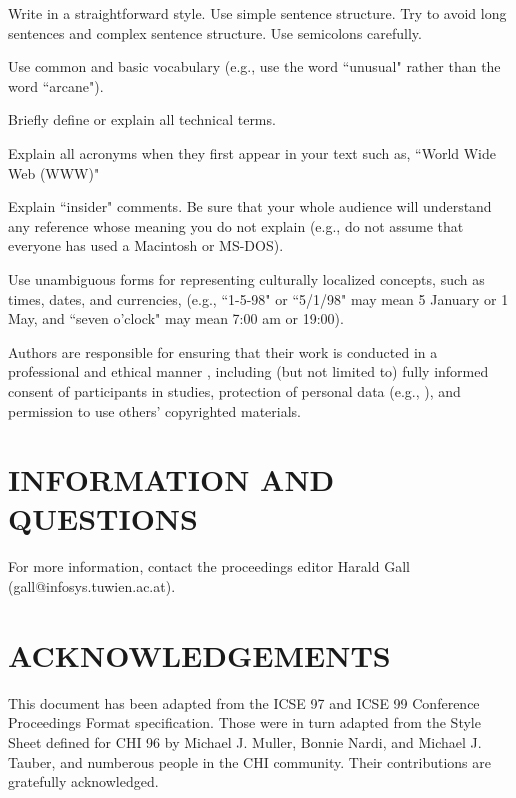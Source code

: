 \begin{smallitem}
\item Write in a straightforward style. Use simple sentence 
structure. Try to avoid long sentences and complex sentence 
structure. Use semicolons carefully.
 
\item Use common and basic vocabulary (e.g., use the word 
``unusual" rather than the word ``arcane").
 
\item Briefly define or explain all technical terms.
 
\item Explain all acronyms when they first appear in your text 
such as, ``World Wide Web (WWW)"
 
\item Explain ``insider" comments. Be sure that your whole 
audience will understand any reference whose meaning 
you do not explain (e.g., do not assume that everyone 
has used a Macintosh or MS-DOS).
 
\item Use unambiguous forms for representing culturally 
localized concepts, such as times, dates, and currencies, 
(e.g., ``1-5-98" or ``5/1/98" may mean 5 January or 1 
May, and ``seven o'clock" may mean 7:00 am or 19:00).
\end{smallitem}
 
Authors are responsible for ensuring that their work is 
conducted in a professional and ethical manner \cite{Anderson:Impacts}, 
including (but not limited to) fully informed consent of 
participants in studies, protection of personal data 
(e.g., \cite{Mackay:Ethics}), 
and permission to use others' copyrighted materials.

\section{INFORMATION AND QUESTIONS}
For more information, contact the proceedings editor Harald Gall
(gall@infosys.tuwien.ac.at).

\section*{ACKNOWLEDGEMENTS}
This document has been adapted from the ICSE 97 and ICSE 99 Conference
Proceedings Format specification.  Those were in turn adapted from the Style
Sheet defined for CHI 96 by Michael J. Muller, Bonnie Nardi, and Michael
J. Tauber, and numberous people in the CHI community. Their contributions are
gratefully acknowledged.


